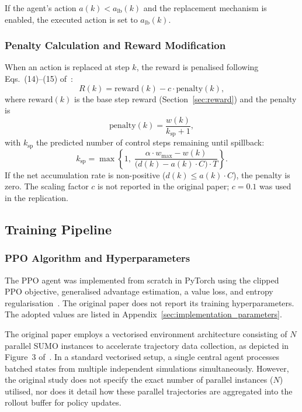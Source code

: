 If the agent's action $a(k) < a_{\mathrm{lb}}(k)$ and the replacement mechanism is enabled, the executed action is set to $a_{\mathrm{lb}}(k)$.

\subsubsection{Penalty Calculation and Reward Modification}
\label{sec:penalty}

When an action is replaced at step $k$, the reward is penalised following Eqs.~(14)--(15) of~\cite{Yang2025Reinforcement}:
\[
R(k) = \text{reward}(k) - c \cdot \mathrm{penalty}(k),
\]
where $\text{reward}(k)$ is the base step reward (Section~\ref{sec:reward}) and the penalty is
\[
\mathrm{penalty}(k) = \frac{w(k)}{k_{\mathrm{sp}} + 1},
\]
with $k_{\mathrm{sp}}$ the predicted number of control steps remaining until spillback:
\[
k_{\mathrm{sp}} = \max\!\left\{1,\; \frac{\alpha \cdot w_{\max} - w(k)}{\bigl(d(k) - a(k) \cdot C\bigr) \cdot T}\right\}.
\]
If the net accumulation rate is non-positive ($d(k) \le a(k) \cdot C$), the penalty is zero. The scaling factor $c$ is not reported in the original paper; $c = 0.1$ was used in the replication.


\subsection{Training Pipeline}

\subsubsection{PPO Algorithm and Hyperparameters}
\label{sec:ppo}

The PPO agent was implemented from scratch in PyTorch using the clipped PPO objective, generalised advantage estimation, a value loss, and entropy regularisation~\cite{Schulman2015GAE}. The original paper does not report its training hyperparameters. The adopted values are listed in Appendix~\ref{sec:implementation_parameters}.

The original paper employs a vectorised environment architecture consisting of $N$ parallel SUMO instances to accelerate trajectory data collection, as depicted in Figure~3 of~\cite{Yang2025Reinforcement}. In a standard vectorised setup, a single central agent processes batched states from multiple independent simulations simultaneously. However, the original study does not specify the exact number of parallel instances ($N$) utilised, nor does it detail how these parallel trajectories are aggregated into the rollout buffer for policy updates.

